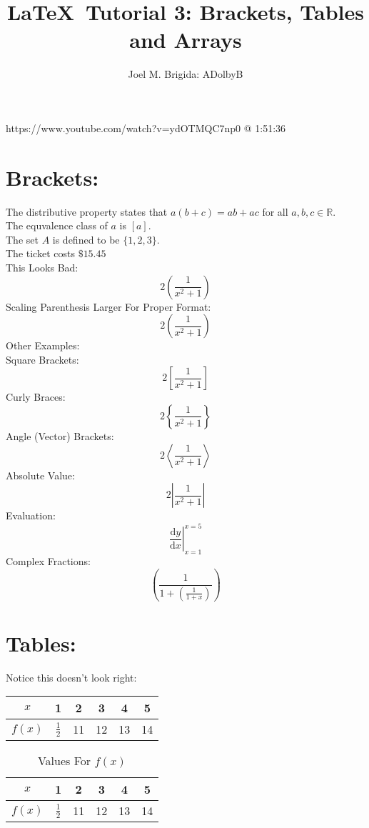 \documentclass[11pt]{article} %
\begin{document}
\title{\LaTeX\ Tutorial 3: Brackets, Tables and Arrays}
\author{Joel M. Brigida: ADolbyB}
\maketitle %

https://www.youtube.com/watch?v=ydOTMQC7np0 @ 1:51:36

\section{Brackets:}
\thispagestyle{empty} %

The distributive property states that $a(b+c) = ab + ac$ for all $a, b, c \in \mathbb{R}$.\\[6pt]
The equvalence class of $a$ is $[a]$.\\[6pt]
The set $A$ is defined to be $\{1, 2, 3\}$.\\[6pt]
The ticket costs $\$15.45$\\[6pt]
This Looks Bad: $$ 2(\frac{1}{x^2 +1}) $$
Scaling Parenthesis Larger For Proper Format: $$ 2\left(\frac{1}{x^2+1}\right) $$
Other Examples:\\[6pt]
Square Brackets:
$$ 2\left[\frac{1}{x^2+1}\right] $$
Curly Braces:
$$ 2\left\{\frac{1}{x^2+1}\right\} $$
Angle (Vector) Brackets:
$$ 2\left\langle\frac{1}{x^2+1}\right\rangle $$
Absolute Value:
$$ 2\left|\frac{1}{x^2+1}\right| $$
Evaluation:
$$ \left.\frac{\mathrm{d}y}{\mathrm{d}x}\right|_{x=1}^{x=5} $$
Complex Fractions:
$$ \left(\frac{1}{1 + \left(\frac{1}{1+x}\right)}\right) $$

\pagebreak

\section{Tables:}
Notice this doesn't look right:\\[6pt]
\begin{tabular}{|c||c|c|c|c|c|} %
    \hline
    $x$ & 1 & 2 & 3 & 4 & 5 \\ \hline
    $f(x)$ & $\frac{1}{2}$ & 11 & 12 & 13 & 14 \\ \hline
\end{tabular}

\vspace{1cm} %

\begin{table}[h!] %
\centering
\def\arraystretch{1.4}
\caption{Values For $f(x)$}
\begin{tabular}{|c||c|c|c|c|c|}
    \hline
    $x$ & 1 & 2 & 3 & 4 & 5 \\ \hline
    $f(x)$ & $\frac{1}{2}$ & 11 & 12 & 13 & 14 \\ \hline
\end{tabular}
\end{table}
\end{document}
